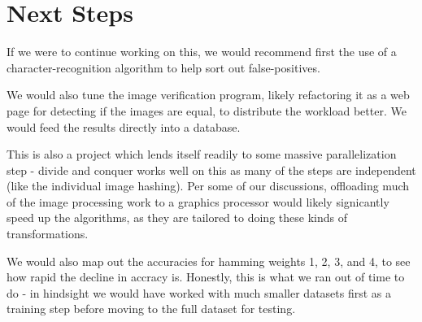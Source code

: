 \documentclass[11pt,a4paper,titlepage]{article}
\begin{document}
\section{Next Steps}

If we were to continue working on this, we would recommend first the use of a
character-recognition algorithm to help sort out false-positives.

We would also tune the image verification program, likely refactoring it as a
web page for detecting if the images are equal, to distribute the workload
better.  We would feed the results directly into a database.

This is also a project which lends itself readily to some massive
parallelization step - divide and conquer works well on this as many of the
steps are independent (like the individual image hashing).  Per some of our
discussions, offloading much of the image processing work to a graphics
processor would likely signicantly speed up the algorithms, as they are
tailored to doing these kinds of transformations.

We would also map out the accuracies for hamming weights 1, 2, 3, and 4, to see
how rapid the decline in accracy is.  Honestly, this is what we ran out of time
to do - in hindsight we would have worked with much smaller datasets first as a
training step before moving to the full dataset for testing.
\end{document}
